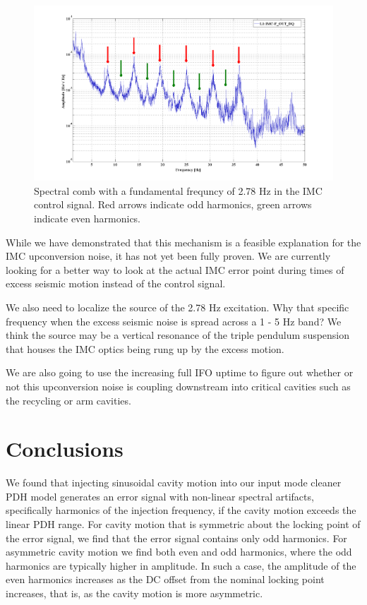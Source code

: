 \begin{figure}[h!]
\includegraphics[height=0.6\textwidth]{figures/IMCUpconversion/upconversion_comb.png}
\caption[Spectral comb in IMC control signal]{Spectral comb with a fundamental frequncy of 2.78 Hz in the IMC control signal. Red arrows indicate odd harmonics, green arrows indicate even harmonics. }
\end{figure}

While we have demonstrated that this mechanism is a feasible explanation for the IMC upconversion noise, it has not yet been fully proven. We are currently looking for a better way to look at the actual IMC error point during times of excess seismic motion instead of the control signal. 

We also need to localize the source of the 2.78 Hz excitation. Why that specific frequency when the excess seismic noise is spread across a 1 - 5 Hz band? We think the source may be a vertical resonance of the triple pendulum suspension that houses the IMC optics being rung up by the excess motion.

We are also going to use the increasing full IFO uptime to figure out whether or not this upconversion noise is coupling downstream into critical cavities such as the recycling or arm cavities.

\section{Conclusions}

We found that injecting sinusoidal cavity motion into our input mode cleaner PDH model generates an error signal with non-linear spectral artifacts, specifically harmonics of the injection frequency, if the cavity motion exceeds the linear PDH range. For cavity motion that is symmetric about the locking point of the error signal, we find that the error signal contains only odd harmonics. For asymmetric cavity motion we find both even and odd harmonics, where the odd harmonics are typically higher in amplitude. In such a case, the amplitude of the even harmonics increases as the DC offset from the nominal locking point increases, that is, as the cavity motion is more asymmetric.

